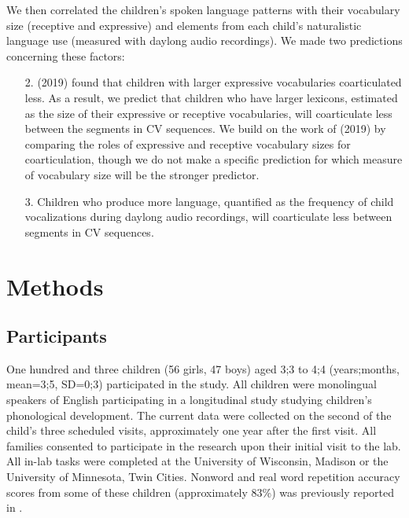 \documentclass[a4paper,man,natbib,donotrepeattitle, apacite]{apa6}
\begin{document}
We then correlated the children’s spoken language patterns with their vocabulary size (receptive and expressive) and elements from each child’s naturalistic language use (measured with daylong audio recordings). We made two predictions concerning these factors:

\begin{enumerate}
\item[2.] \citeauthor{noiraySpokenLanguageDevelopment2019} (2019) found that children with larger expressive vocabularies coarticulated less. As a result, we predict that children who have larger lexicons, estimated as the size of their expressive or receptive vocabularies, will coarticulate less between the segments in CV sequences. We build on the work of \citeauthor{noiraySpokenLanguageDevelopment2019} (2019) by comparing the roles of expressive and receptive vocabulary sizes for coarticulation, though we do not make a specific prediction for which measure of vocabulary size will be the stronger predictor.

\item[3.] Children who produce more language, quantified as the frequency of child vocalizations during daylong audio recordings, will coarticulate less between segments in CV sequences.
\end{enumerate}

\section{Methods}

\subsection{Participants}

One hundred and three children (56 girls, 47 boys) aged 3;3 to 4;4 (years;months, mean=3;5, SD=0;3) participated in the study. All children were monolingual speakers of English participating in a longitudinal study studying children’s phonological development. The current data were collected on the second of the child’s three scheduled visits, approximately one year after the first visit. All families consented to participate in the research upon their initial visit to the lab. All in-lab tasks were completed at the University of Wisconsin, Madison or the University of Minnesota, Twin Cities. Nonword and real word repetition accuracy scores from some of these children (approximately 83\%) was previously reported in .
\end{document}
